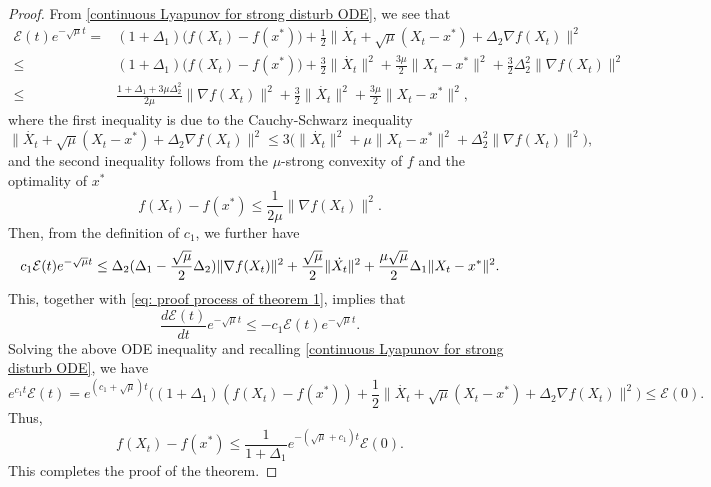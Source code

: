 \documentclass[11pt]{article}
\newcommand{\1}{\mathbf 1}
\numberwithin{equation}{section}
\begin{document}
\begin{proof}
From \eqref{continuous Lyapunov for strong disturb ODE}, we see that
\begin{equation*}
    \begin{aligned}
        \mathcal{E}(t)e^{-\sqrt{\mu}t}
        =&(1+\Delta_1)\big(f(X_t)-f(x^*)\big)+\frac{1}{2}\|\dot{X_t}+\sqrt{\mu}(X_t-x^*)+\Delta_2\nabla f(X_t)\|^2\\
        \leqslant &(1+\Delta_1)\big(f(X_t)-f(x^*)\big)+\frac{3}{2}\|\dot{X_t}\|^2+\frac{3\mu}{2}\|X_t-x^*\|^2+\frac{3}{2}\Delta_2^2\|\nabla f(X_t)\|^2\\
        \leqslant &\frac{1+\Delta_1+3\mu \Delta_2^2}{2\mu} \|\nabla f(X_t)\|^2+\frac{3}{2}\|\dot{X_t}\|^2+\frac{3\mu}{2}\|X_t-x^*\|^2,
    \end{aligned}
\end{equation*}
{where the first inequality is due to the Cauchy-Schwarz inequality
\begin{equation*}
    \|\dot{X_t}+\sqrt{\mu}(X_t-x^*)+\Delta_2\nabla f(X_t)\|^2 \leqslant 3\big(\|\dot{X_t}\|^2+\mu\|X_t-x^*\|^2+\Delta_2^2\|\nabla f(X_t)\|^2\big),
\end{equation*}
and the second inequality follows from the $\mu$-strong convexity of $f$ and the optimality of $x^*$
\begin{equation*}
    f(X_t)-f(x^*)\leqslant \frac{1}{2\mu}\|\nabla f(X_t)\|^2.
\end{equation*}}
Then, from the definition of $c_1$, we further have
\begin{equation*}\label{eq:c1et}
c_1 {\cal E}(t)e^{-\sqrt{\mu}t} \le \Delta_2(\Delta_1-\frac{\sqrt{\mu}}{2}\Delta_2)\|\nabla f(X_t)\|^2+\frac{\sqrt{\mu}}{2}\|\dot{X_t}\|^2+\frac{\mu\sqrt{\mu}}{2}\Delta_1\|X_t-x^*\|^2.
\end{equation*}
This, together with \eqref{eq: proof process of theorem 1}, implies that
\[
\frac{d \mathcal{E}(t)}{d t}e^{-\sqrt{\mu}t} \leqslant -c_1\mathcal{E}(t)e^{-\sqrt{\mu}t}.
\]
Solving the above ODE inequality and recalling \eqref{continuous Lyapunov for strong disturb ODE}, we have
$$e^{c_1 t}\mathcal{E}(t)=e^{(c_1+\sqrt{\mu})t}\big((1+\Delta_1)(f(X_t)-f(x^*))+\frac{1}{2}\|\dot{X_t}+\sqrt{\mu}(X_t-x^*)+\Delta_2\nabla f(X_t)\|^2\big)\leqslant \mathcal{E}(0).$$
Thus,
\begin{equation*}
    f(X_t)-f(x^*)\leqslant \frac{1}{1+\Delta_1}e^{-(\sqrt{\mu}+c_1)t}\mathcal{E}(0).
\end{equation*}
This completes the proof of the theorem.
\end{proof}
\end{document}
